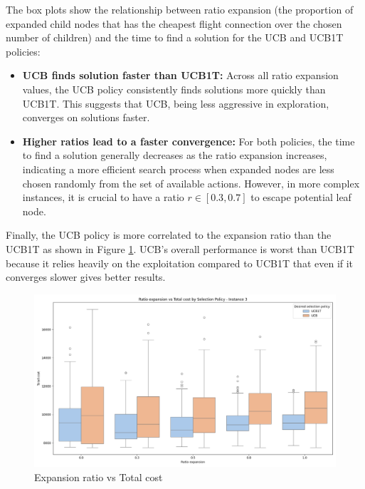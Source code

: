 The box plots show the relationship between ratio expansion (the proportion of expanded child nodes that has the cheapest flight connection over the chosen number of children) and the time to find a solution for the UCB and UCB1T policies:

\begin{itemize}
    \item \textbf{UCB finds solution faster than UCB1T:}
          Across all ratio expansion values, the UCB policy consistently finds solutions more quickly than UCB1T. This suggests that UCB, being less aggressive in exploration, converges on solutions faster.


    \item \textbf{Higher ratios lead to a faster convergence:}
          For both policies, the time to find a solution generally decreases as the ratio expansion increases, indicating a more efficient search process when expanded nodes are less chosen randomly from the set of available actions. However, in more complex instances, it is crucial to have a ratio $r \in [0.3,0.7]$ to escape potential leaf node.
\end{itemize}

Finally, the UCB policy is more correlated to the expansion ratio than the UCB1T as shown in Figure \ref{fig:ratio_vs_cost_3}. UCB's overall performance is worst than UCB1T because it relies heavily on the exploitation compared to UCB1T that even if it converges slower gives better results.

\begin{figure}[!ht]
    \centering
    \includegraphics[width=\textwidth]{Figures/3 - ratio_vs_cost.png}
    \caption{Expansion ratio vs Total cost}
    \label{fig:ratio_vs_cost_3}
\end{figure}
\newpage
\newpage
